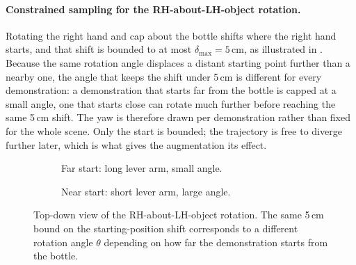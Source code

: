 \paragraph{Constrained sampling for the RH-about-LH-object rotation.}
Rotating the right hand and cap about the bottle shifts where the right hand starts, and that shift
is bounded to at most $\delta_{\max} = 5$\,cm, as illustrated in . Because the
same rotation angle displaces a distant starting point further than a nearby one, the angle that
keeps the shift under 5\,cm is different for every demonstration: a demonstration that starts far
from the bottle is capped at a small angle, one that starts close can rotate much further before
reaching the same 5\,cm shift. The yaw is therefore drawn per demonstration rather than fixed for
the whole scene. Only the start is bounded; the trajectory is free to diverge further later, which
is what gives the augmentation its effect.

\begin{figure}[H]
  \centering
  \begin{subfigure}[b]{0.47\linewidth}
    \centering
    \caption{Far start: long lever arm, small angle.}
  \end{subfigure}
  \hfill
  \begin{subfigure}[b]{0.47\linewidth}
    \centering
    \caption{Near start: short lever arm, large angle.}
  \end{subfigure}
  \caption{Top-down view of the RH-about-LH-object rotation. The same 5\,cm bound on the
  starting-position shift corresponds to a different rotation angle $\theta$ depending on how far
  the demonstration starts from the bottle.}
  \label{fig:start-shift}
\end{figure}


